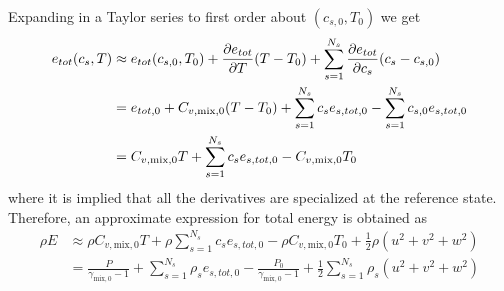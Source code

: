 Expanding in a Taylor series to first order about $(c_{s,0},T_0)$ we get
%
\begin{equation}
\begin{split}
e_{tot}(c_s, T) 
&\approx e_{tot}(c_{s,0}, T_0) 
 + \frac{\partial e_{tot}}{\partial T} (T-T_0) + \sum_{s=1}^{N_s} \frac{\partial e_{tot}}{\partial c_s} (c_s-c_{s,0})\\
&= e_{tot,0}
 + C_{v,\text{mix},0} (T-T_0) + \sum_{s=1}^{N_s} c_s e_{s,tot,0} - \sum_{s=1}^{N_s}  c_{s,0} e_{s,tot,0} \\
&= C_{v,\text{mix},0}  T      + \sum_{s=1}^{N_s} c_s e_{s,tot,0} - C_{v,\text{mix},0} T_0  \\
\end{split}
\end{equation}
%
where it is implied that all the derivatives are specialized at the reference state.
Therefore, an approximate expression for total energy is obtained as
\begin{equation}
\begin{split}
\rho E 
&\approx \rho C_{v,\text{mix},0} T 
   + \rho \sum_{s=1}^{N_s} c_s e_{s,tot,0} 
   - \rho C_{v,\text{mix},0} T_0 
   + \frac{1}{2} \rho \left( u^2 + v^2+ w^2 \right) \\
&= \frac{P}{\gamma_{\text{mix},0}-1}
   + \sum_{s=1}^{N_s} \rho_s e_{s,tot,0} 
   - \frac{P_0}{\gamma_{\text{mix},0}-1}
   + \frac{1}{2} \sum_{s=1}^{N_s} \rho_s \left( u^2 + v^2+ w^2 \right)
\end{split}
\end{equation}

